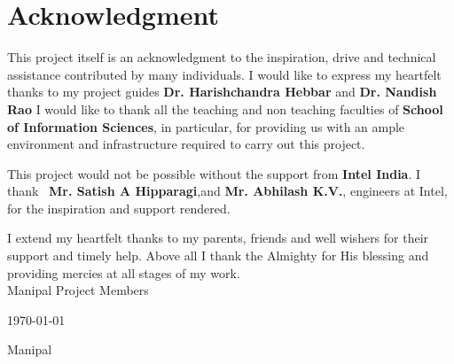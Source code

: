 \documentclass{mainreport}
\begin{document}
\maketitle
\makecertificate

\parindent 10mm
\chapter*{Acknowledgment}\label{ack}
{\label{ack} 

\hspace{6mm} This project itself is an acknowledgment to the inspiration, drive and technical
assistance contributed by many individuals. I would like to express my heartfelt thanks to my project guides 
{\bf Dr. Harishchandra Hebbar} and {\bf Dr. Nandish Rao}
I would like to thank all the teaching and non teaching faculties of {\bf School of Information Sciences}, 
in particular, for providing us with an ample environment and
infrastructure required to carry out this project. 

This project would not be possible without the support from {\bf Intel India}. I thank \
{\bf Mr. Satish A Hipparagi},and {\bf Mr. Abhilash K.V.}, engineers at Intel,
for the inspiration and support rendered.

I extend my heartfelt thanks to my parents, friends and well wishers for their 
support and timely help. Above all I thank the Almighty for His blessing and 
providing mercies at all stages of my work. \\[2cm]




\noindent Manipal \hfill Project Members

\noindent \today \hfill \institutename

 \hfill Manipal





}
\end{document}
